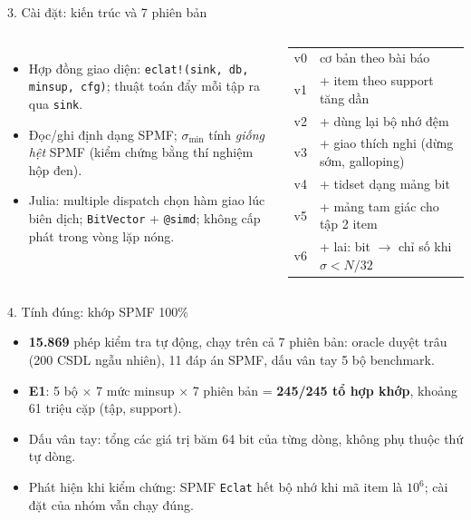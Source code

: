 \documentclass[aspectratio=169, 11pt]{beamer}
\begin{document}
\begin{frame}{3. Cài đặt: kiến trúc và 7 phiên bản}
\begin{columns}[T]
\begin{itemize}
\item Hợp đồng giao diện: \texttt{eclat!(sink, db, minsup, cfg)}; thuật toán đẩy mỗi tập ra qua \texttt{sink}.
\item Đọc/ghi định dạng SPMF; $\sigma_{\min}$ tính \emph{giống hệt} SPMF (kiểm chứng bằng thí nghiệm hộp đen).
\item Julia: multiple dispatch chọn hàm giao lúc biên dịch; \texttt{BitVector} + \texttt{@simd}; không cấp phát trong vòng lặp nóng.
\end{itemize}
\footnotesize
\begin{tabular}{@{}ll@{}}
\toprule
v0 & cơ bản theo bài báo \\
v1 & + item theo support tăng dần \\
v2 & + dùng lại bộ nhớ đệm \\
v3 & + giao thích nghi (dừng sớm, galloping) \\
v4 & + tidset dạng mảng bit \\
v5 & + mảng tam giác cho tập 2 item \\
v6 & + lai: bit $\to$ chỉ số khi $\sigma < N/32$ \\
\bottomrule
\end{tabular}
\end{columns}
\end{frame}

\begin{frame}{4. Tính đúng: khớp SPMF 100\%}
\begin{itemize}
\item \textbf{15.869} phép kiểm tra tự động, chạy trên cả 7 phiên bản:
  oracle duyệt trâu (200 CSDL ngẫu nhiên), 11 đáp án SPMF, dấu vân tay 5 bộ benchmark.
\item \textbf{E1}: 5 bộ $\times$ 7 mức minsup $\times$ 7 phiên bản = \textbf{245/245 tổ hợp khớp}, khoảng 61 triệu cặp (tập, support).
\item Dấu vân tay: tổng các giá trị băm 64 bit của từng dòng, không phụ thuộc thứ tự dòng.
\item Phát hiện khi kiểm chứng: SPMF \texttt{Eclat} hết bộ nhớ khi mã item là $10^6$; cài đặt của nhóm vẫn chạy đúng.
\end{itemize}
\end{frame}
\end{document}
